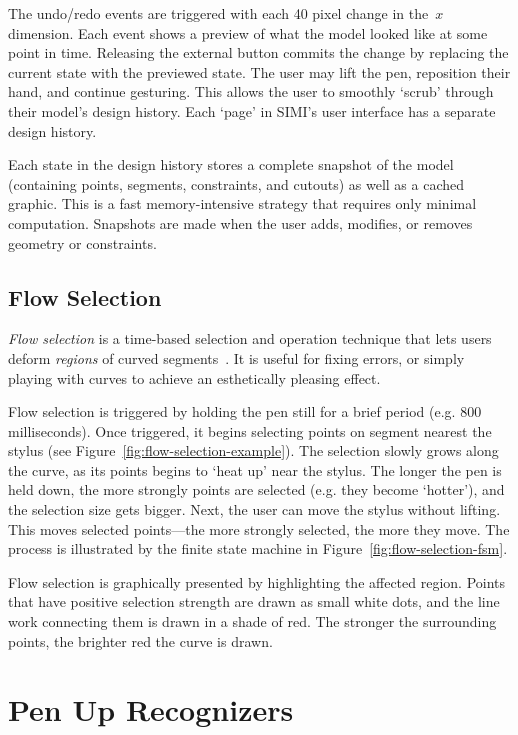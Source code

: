 The undo/redo events are triggered with each 40 pixel change in
the~$x$ dimension. Each event shows a preview of what the model looked
like at some point in time. Releasing the external button commits the
change by replacing the current state with the previewed state. The
user may lift the pen, reposition their hand, and continue
gesturing. This allows the user to smoothly `scrub' through their
model's design history. Each `page' in SIMI's user interface has a
separate design history.

Each state in the design history stores a complete snapshot of the
model (containing points, segments, constraints, and cutouts) as well
as a cached graphic. This is a fast memory-intensive strategy that
requires only minimal computation. Snapshots are made when the user
adds, modifies, or removes geometry or constraints.

\subsection{Flow Selection}



\textit{Flow selection} is a time-based selection and operation
technique that lets users deform \textit{regions} of curved
segments~\cite{johnson-flow-selection}. It is useful for fixing
errors, or simply playing with curves to achieve an esthetically
pleasing effect.

Flow selection is triggered by holding the pen still for a brief
period (e.g. 800 milliseconds). Once triggered, it begins selecting
points on segment nearest the stylus (see
Figure~\ref{fig:flow-selection-example}). The selection slowly grows
along the curve, as its points begins to `heat up' near the
stylus. The longer the pen is held down, the more strongly points are
selected (e.g. they become `hotter'), and the selection size gets
bigger. Next, the user can move the stylus without lifting. This moves
selected points---the more strongly selected, the more they move. The
process is illustrated by the finite state machine in
Figure~\ref{fig:flow-selection-fsm}.

Flow selection is graphically presented by highlighting the affected
region. Points that have positive selection strength are drawn as
small white dots, and the line work connecting them is drawn in a shade
of red. The stronger the surrounding points, the brighter red the
curve is drawn.

\section{Pen Up Recognizers}

